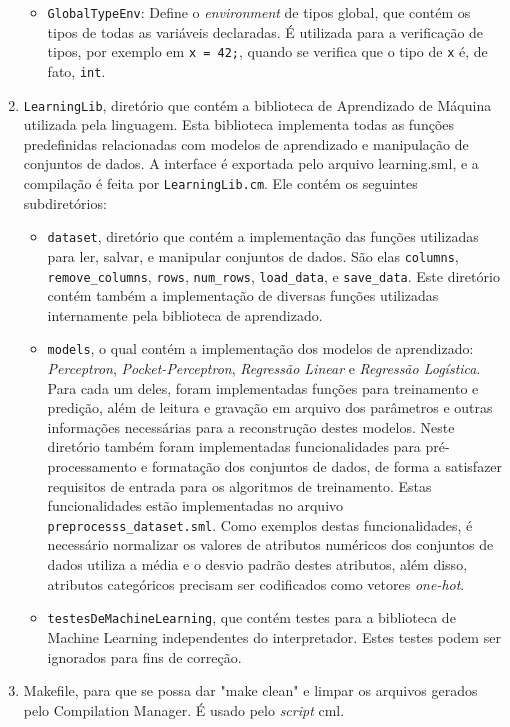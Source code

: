 \documentclass[12pt]{article}
\begin{document}
\begin{enumerate}
\begin{itemize}
\item \texttt{GlobalTypeEnv}: Define o \textit{environment} de tipos global, que contém os tipos de todas as variáveis declaradas. É utilizada para a verificação de tipos, por exemplo em \texttt{x = 42;}, quando se verifica que o tipo de \texttt{x} é, de fato, \texttt{int}.
\end{itemize}
\item \texttt{LearningLib}, diretório que contém a biblioteca de Aprendizado de Máquina utilizada pela linguagem. Esta biblioteca implementa todas as funções predefinidas relacionadas com modelos de aprendizado e manipulação de conjuntos de dados. A interface é exportada pelo arquivo learning.sml, e a compilação é feita por \texttt{LearningLib.cm}. Ele contém os seguintes subdiretórios:

\begin{itemize} \item \texttt{dataset}, diretório que contém a implementação das funções utilizadas para ler, salvar, e manipular conjuntos de dados. São elas \texttt{columns}, \texttt{remove\_columns}, \texttt{rows}, \texttt{num\_rows}, \texttt{load\_data}, e \texttt{save\_data}. Este diretório contém também a implementação de diversas funções utilizadas internamente pela biblioteca de aprendizado.

\item \texttt{models}, o qual contém a implementação dos modelos de aprendizado: \textit{Perceptron}, \textit{Pocket-Perceptron}, \textit{Regressão Linear} e \textit{Regressão Logística}. Para cada um deles, foram implementadas funções para treinamento e predição, além de leitura e gravação em arquivo dos parâmetros e outras informações necessárias para a reconstrução destes modelos. Neste diretório também foram implementadas funcionalidades para pré-processamento e formatação dos conjuntos de dados, de forma a satisfazer requisitos de entrada para os algoritmos de treinamento. Estas funcionalidades estão implementadas no arquivo \texttt{preprocesss\_dataset.sml}. Como exemplos destas funcionalidades, é necessário normalizar os valores de atributos numéricos dos conjuntos de dados utiliza a média e o desvio padrão destes atributos, além disso, atributos categóricos precisam ser codificados como vetores \textit{one-hot}.

\item \texttt{testesDeMachineLearning}, que contém testes para a biblioteca de Machine Learning independentes do interpretador. Estes testes podem ser ignorados para fins de correção.
\end{itemize}

\item Makefile, para que se possa dar "make clean" e limpar os arquivos gerados pelo Compilation Manager. É usado pelo \textit{script} cml.
\end{enumerate}
\end{document}
